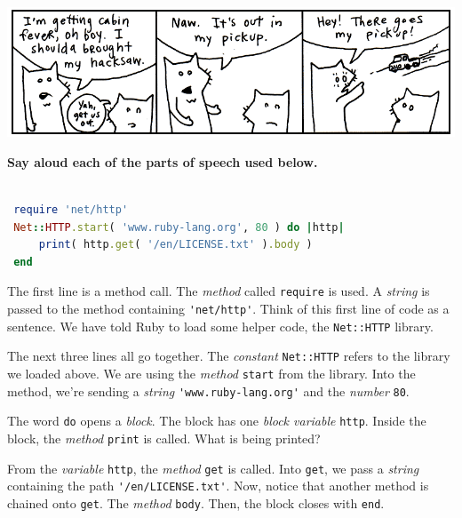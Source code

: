 \documentclass[10pt,twoside]{report}
\begin{document}
	\includegraphics[width=1.0\textwidth]{cache/17.png}

{\bf Say aloud each of the parts of speech used below.}


\begin{lstlisting}[basicstyle=\ttfamily\color{basiccolor},
    commentstyle = \ttfamily\color{commentcolor},
    keywordstyle=\ttfamily\color{keywordscolor},
    stringstyle=\color{stringcolor},
    language=Ruby,
    basicstyle=\small\ttfamily,
    showstringspaces=false,
  ]

 require 'net/http' 
 Net::HTTP.start( 'www.ruby-lang.org', 80 ) do |http| 
     print( http.get( '/en/LICENSE.txt' ).body ) 
 end

\end{lstlisting}


The first line is a method call.  The {\em method} called
\lstinline[breaklines=true]|require| is used.  A {\em string} is
passed to the method containing
\lstinline[breaklines=true]|'net/http'|.  Think of this first line of
code as a sentence.  We have told Ruby to load some helper code, the
\lstinline[breaklines=true]|Net::HTTP| library.

The next three lines all go together.  The {\em constant}
\lstinline[breaklines=true]|Net::HTTP| refers to the library we loaded
above. We are using the {\em method}
\lstinline[breaklines=true]|start| from the library.  Into the method,
we're sending a {\em string}
\lstinline[breaklines=true]|'www.ruby-lang.org'| and the {\em number}
\lstinline[breaklines=true]|80|.

The word \lstinline[breaklines=true]|do| opens a {\em block}.  The
block has one {\em block variable} \lstinline[breaklines=true]|http|.
Inside the block, the {\em method} \lstinline[breaklines=true]|print|
is called.  What is being printed?

From the {\em variable} \lstinline[breaklines=true]|http|, the {\em
  method} \lstinline[breaklines=true]|get| is called.  Into
\lstinline[breaklines=true]|get|, we pass a {\em string} containing
the path \lstinline[breaklines=true]|'/en/LICENSE.txt'|.  Now, notice
that another method is chained onto \lstinline[breaklines=true]|get|.
The {\em method} \lstinline[breaklines=true]|body|.  Then, the block
closes with \lstinline[breaklines=true]|end|.
\end{document}
